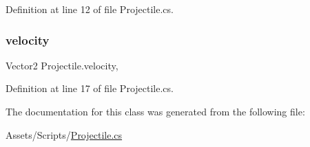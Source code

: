 Definition at line 12 of file Projectile.\+cs.

\mbox{\label{class_projectile_a2d9755facfa238e047de85c626587cd2}} 
\subsubsection{\texorpdfstring{velocity}{velocity}}
{\footnotesize\ttfamily Vector2 Projectile.\+velocity\hspace{0.3cm}{\ttfamily [get]}, {\ttfamily [set]}}



Definition at line 17 of file Projectile.\+cs.



The documentation for this class was generated from the following file\+:\begin{DoxyCompactItemize}
\item 
Assets/\+Scripts/\mbox{\hyperlink{_projectile_8cs}{Projectile.\+cs}}\end{DoxyCompactItemize}

